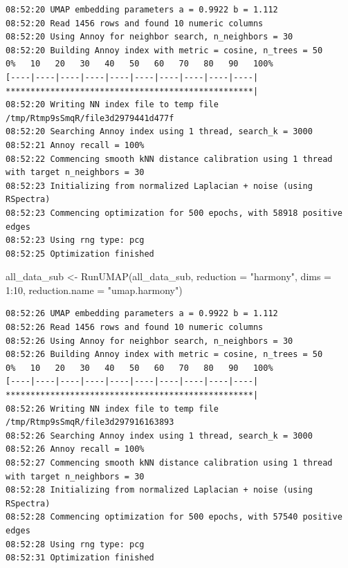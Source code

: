 \documentclass[
  letterpaper,
  DIV=11,
  numbers=noendperiod]{scrreprt}
\newenvironment{Shaded}{\begin{snugshade}}{\end{snugshade}}
\newcommand{\AttributeTok}[1]{\textcolor[rgb]{0.40,0.45,0.13}{#1}}
\newcommand{\DecValTok}[1]{\textcolor[rgb]{0.68,0.00,0.00}{#1}}
\newcommand{\FunctionTok}[1]{\textcolor[rgb]{0.28,0.35,0.67}{#1}}
\newcommand{\NormalTok}[1]{\textcolor[rgb]{0.00,0.23,0.31}{#1}}
\newcommand{\OtherTok}[1]{\textcolor[rgb]{0.00,0.23,0.31}{#1}}
\newcommand{\SpecialCharTok}[1]{\textcolor[rgb]{0.37,0.37,0.37}{#1}}
\newcommand{\StringTok}[1]{\textcolor[rgb]{0.13,0.47,0.30}{#1}}
\begin{document}
\begin{verbatim}
08:52:20 UMAP embedding parameters a = 0.9922 b = 1.112
08:52:20 Read 1456 rows and found 10 numeric columns
08:52:20 Using Annoy for neighbor search, n_neighbors = 30
08:52:20 Building Annoy index with metric = cosine, n_trees = 50
0%   10   20   30   40   50   60   70   80   90   100%
[----|----|----|----|----|----|----|----|----|----|
**************************************************|
08:52:20 Writing NN index file to temp file /tmp/Rtmp9sSmqR/file3d2979441d477f
08:52:20 Searching Annoy index using 1 thread, search_k = 3000
08:52:21 Annoy recall = 100%
08:52:22 Commencing smooth kNN distance calibration using 1 thread with target n_neighbors = 30
08:52:23 Initializing from normalized Laplacian + noise (using RSpectra)
08:52:23 Commencing optimization for 500 epochs, with 58918 positive edges
08:52:23 Using rng type: pcg
08:52:25 Optimization finished
\end{verbatim}

\begin{Shaded}
\begin{Highlighting}[]
\NormalTok{all\_data\_sub }\OtherTok{\textless{}{-}} \FunctionTok{RunUMAP}\NormalTok{(all\_data\_sub, }\AttributeTok{reduction =} \StringTok{"harmony"}\NormalTok{, }\AttributeTok{dims =} \DecValTok{1}\SpecialCharTok{:}\DecValTok{10}\NormalTok{, }\AttributeTok{reduction.name =} \StringTok{"umap.harmony"}\NormalTok{)}
\end{Highlighting}
\end{Shaded}

\begin{verbatim}
08:52:26 UMAP embedding parameters a = 0.9922 b = 1.112
08:52:26 Read 1456 rows and found 10 numeric columns
08:52:26 Using Annoy for neighbor search, n_neighbors = 30
08:52:26 Building Annoy index with metric = cosine, n_trees = 50
0%   10   20   30   40   50   60   70   80   90   100%
[----|----|----|----|----|----|----|----|----|----|
**************************************************|
08:52:26 Writing NN index file to temp file /tmp/Rtmp9sSmqR/file3d297916163893
08:52:26 Searching Annoy index using 1 thread, search_k = 3000
08:52:26 Annoy recall = 100%
08:52:27 Commencing smooth kNN distance calibration using 1 thread with target n_neighbors = 30
08:52:28 Initializing from normalized Laplacian + noise (using RSpectra)
08:52:28 Commencing optimization for 500 epochs, with 57540 positive edges
08:52:28 Using rng type: pcg
08:52:31 Optimization finished
\end{verbatim}
\end{document}

